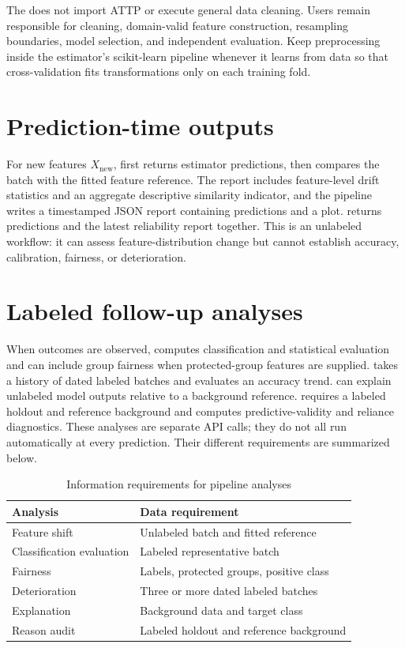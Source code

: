 \documentclass[conference]{IEEEtran}
\begin{document}
The  does not import ATTP or execute general data cleaning. Users remain responsible for cleaning, domain-valid feature construction, resampling boundaries, model selection, and independent evaluation. Keep preprocessing inside the estimator's scikit-learn pipeline whenever it learns from data so that cross-validation fits transformations only on each training fold.

\section{Prediction-time outputs}
For new features \(X_{\mathrm{new}}\),  first returns estimator predictions, then compares the batch with the fitted feature reference. The report includes feature-level drift statistics and an aggregate descriptive similarity indicator, and the pipeline writes a timestamped JSON report containing predictions and a plot.  returns predictions and the latest reliability report together. This is an unlabeled workflow: it can assess feature-distribution change but cannot establish accuracy, calibration, fairness, or deterioration.

\section{Labeled follow-up analyses}
When outcomes are observed,  computes classification and statistical evaluation and can include group fairness when protected-group features are supplied.  takes a history of dated labeled batches and evaluates an accuracy trend.  can explain unlabeled model outputs relative to a background reference.  requires a labeled holdout and reference background and computes predictive-validity and reliance diagnostics. These analyses are separate API calls; they do not all run automatically at every prediction. Their different requirements are summarized below.

\begin{table}[t]
\caption{Information requirements for pipeline analyses}
\label{tab:reqs}
\centering
\small
\setlength{\tabcolsep}{2pt}
\begin{tabular}{p{}p{}}
\toprule
Analysis & Data requirement\\
\midrule
Feature shift & Unlabeled batch and fitted reference\\
Classification evaluation & Labeled representative batch\\
Fairness & Labels, protected groups, positive class\\
Deterioration & Three or more dated labeled batches\\
Explanation & Background data and target class\\
Reason audit & Labeled holdout and reference background\\
\bottomrule
\end{tabular}
\end{table}
\end{document}
